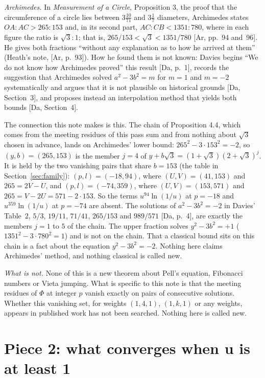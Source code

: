 \documentclass[11pt]{article}
\begin{document}
\medskip
\noindent\emph{Archimedes.} In \emph{Measurement of a Circle}, Proposition 3, the proof that the circumference of a circle lies between $3\frac{10}{71}$ and $3\frac17$ diameters, Archimedes states $OA:AC>265:153$ and, in its second part, $AC:CB<1351:780$, where in each figure the ratio is $\sqrt3:1$; that is, $265/153<\sqrt3<1351/780$ [Ar, pp.~94 and~96]. He gives both fractions ``without any explanation as to how he arrived at them'' (Heath's note, [Ar, p.~93]). How he found them is not known: Davies begins ``We do not know how Archimedes proved'' this result [Da, p.~1], records the suggestion that Archimedes solved $a^2-3b^2=m$ for $m=1$ and $m=-2$ systematically and argues that it is not plausible on historical grounds [Da, Section~3], and proposes instead an interpolation method that yields both bounds [Da, Section~4].

The connection this note makes is this. The chain of Proposition 4.4, which comes from the meeting residues of this pass sum and from nothing about $\sqrt3$ chosen in advance, lands on Archimedes' lower bound: $265^2-3\cdot153^2=-2$, so $(y,b)=(265,153)$ is the member $j=4$ of $y+b\sqrt3=(1+\sqrt3)(2+\sqrt3)^j$. It is held by the two vanishing pairs that share $b=153$ (the table in Section~\ref{sec:family}): $(p,l)=(-18,94)$, where $(U,V)=(41,153)$ and $265=2V-U$, and $(p,l)=(-74,359)$, where $(U,V)=(153,571)$ and $265=V-2U=571-2\cdot153$. So the terms $u^{94}\ln(1/u)$ at $p=-18$ and $u^{359}\ln(1/u)$ at $p=-74$ are absent. The solutions of $a^2-3b^2=-2$ in Davies' Table~2, $5/3$, $19/11$, $71/41$, $265/153$ and $989/571$ [Da, p.~4], are exactly the members $j=1$ to $5$ of the chain. The upper fraction solves $y^2-3b^2=+1$ ($1351^2-3\cdot780^2=1$) and is not on the chain. That a classical bound sits on this chain is a fact about the equation $y^2-3b^2=-2$. Nothing here claims Archimedes' method, and nothing classical is called new.

\medskip
\noindent\emph{What is not.} None of this is a new theorem about Pell's equation, Fibonacci numbers or Vieta jumping. What is specific to this note is that the meeting residues of $\Phi$ at integer $p$ vanish exactly on pairs of consecutive solutions. Whether this vanishing set, for weights $(1,4,1)$, $(1,k,1)$ or any weights, appears in published work has not been searched. Nothing here is called new.

\section{Piece 2: what converges when u is at least 1}\label{sec:P2}
\end{document}
